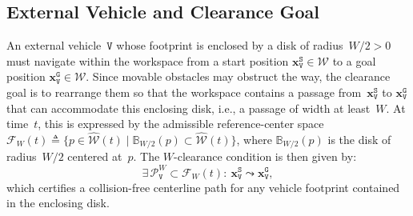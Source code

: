 \subsection{External Vehicle and Clearance Goal}\label{subsec:vehicle}
An external vehicle~$\texttt{V}$ whose footprint is enclosed by a disk of
radius~$W/2>0$ must navigate within the workspace from a start position
$\mathbf{x}_\texttt{V}^{\texttt{S}}\in\mathcal{W}$ to a goal position
$\mathbf{x}_\texttt{V}^{\texttt{G}}\in\mathcal{W}$. Since movable obstacles may
obstruct the way, the clearance goal is to rearrange them so that the workspace
contains a passage from~$\mathbf{x}_\texttt{V}^{\texttt{S}}$ to
$\mathbf{x}_\texttt{V}^{\texttt{G}}$ that can accommodate this enclosing disk,
i.e., a passage of width at least~$W$. At time~$t$, this is expressed by the
admissible reference-center space
$\mathcal{F}_W(t)\triangleq
\{p\in\widehat{\mathcal{W}}(t)\mid
\mathbb{B}_{W/2}(p)\subset\widehat{\mathcal{W}}(t)\}$, where
$\mathbb{B}_{W/2}(p)$ is the disk of radius~$W/2$ centered at~$p$. The
$W$-clearance condition is then given by:
\begin{equation}\label{eq:wclear}
\exists\,\mathcal{P}^W_\texttt{V}\subset\mathcal{F}_W(t):\
\mathbf{x}_\texttt{V}^{\texttt{S}}\leadsto\mathbf{x}_\texttt{V}^{\texttt{G}},
\end{equation}
which certifies a collision-free centerline path for any vehicle footprint
contained in the enclosing disk.




